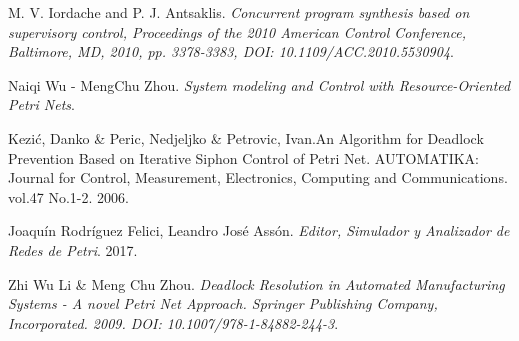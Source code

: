 \begin{thebibliography}{9}
    M. V. Iordache and P. J. Antsaklis.
    \textit{Concurrent program synthesis based on supervisory control, Proceedings of the 2010 American Control Conference, Baltimore, MD, 2010, pp. 3378-3383, DOI: 10.1109/ACC.2010.5530904}.
    
    Naiqi Wu - MengChu Zhou.
    \textit{System modeling and Control with Resource-Oriented Petri Nets}.
    
    Kezić, Danko \& Peric, Nedjeljko \& Petrovic, Ivan.An Algorithm for Deadlock Prevention Based on Iterative Siphon Control of Petri Net. AUTOMATIKA: Journal for Control, Measurement, Electronics, Computing and Communications. vol.47 No.1-2. 2006.
    
    Joaquín Rodríguez Felici, Leandro José Assón. 
    \textit{Editor, Simulador y Analizador de Redes de Petri}. 2017.
    
    Zhi Wu Li \& Meng Chu Zhou.
    \textit{Deadlock Resolution in Automated Manufacturing Systems - A novel Petri Net Approach. Springer Publishing Company, Incorporated. 2009. DOI: 10.1007/978-1-84882-244-3}.

\end{thebibliography}
